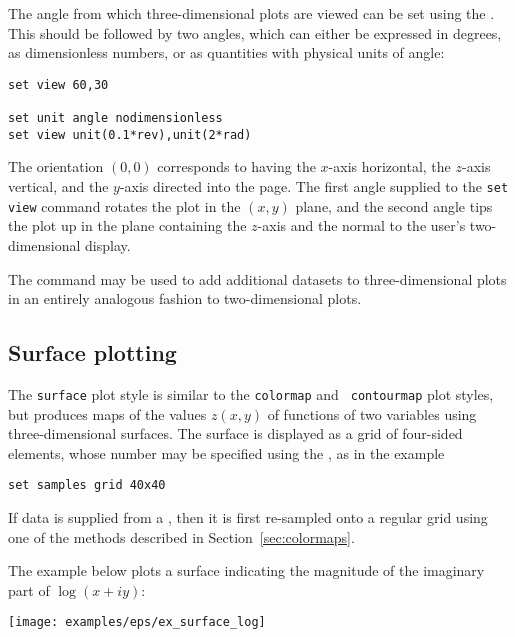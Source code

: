 The angle from which three-dimensional plots are viewed can be set using the
. This should be followed by two angles, which can either be
expressed in degrees, as dimensionless numbers, or as quantities with physical
units of angle:
\begin{verbatim}
set view 60,30

set unit angle nodimensionless
set view unit(0.1*rev),unit(2*rad)
\end{verbatim}
The orientation $(0,0)$ corresponds to having the $x$-axis horizontal, the
$z$-axis vertical, and the $y$-axis directed into the page. The first angle
supplied to the {\tt set view} command rotates the plot in the $(x,y)$ plane,
and the second angle tips the plot up in the plane containing the $z$-axis and
the normal to the user's two-dimensional display.

The  command may be used to add additional datasets to
three-dimensional plots in an entirely analogous fashion to two-dimensional
plots.

\subsection{Surface plotting}
\label{sec:surfaces}

The {\tt surface} plot style is similar to the {\tt colormap} and {\tt
contourmap} plot styles, but produces maps of the values $z(x,y)$ of functions
of two variables using three-dimensional surfaces. The surface is displayed as
a grid of four-sided elements, whose number may be specified using the
, as in the example
\begin{verbatim}
set samples grid 40x40
\end{verbatim}
If data is supplied from a \datafile, then it is first re-sampled onto a regular
grid using one of the methods described in Section~\ref{sec:colormaps}.

The example below plots a surface indicating the magnitude of the imaginary
part of $\log(x+iy)$:

\vspace{2mm}

\vspace{2mm}

\centerline{\texttt{[image: examples/eps/ex\_surface\_log]}}
\vspace{2mm}



